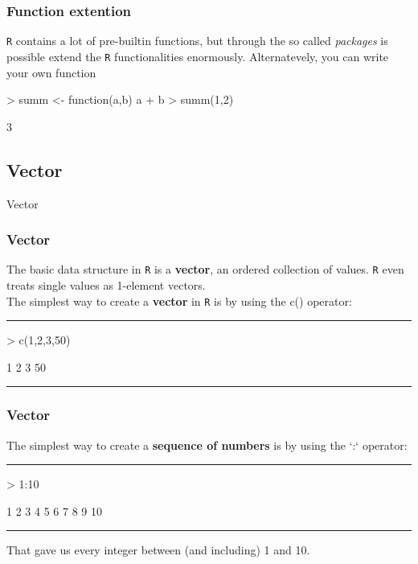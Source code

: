 \documentclass{beamer}
\begin{document}
\begin{frame}[fragile]
	\frametitle{Function extention}
	\texttt{R} contains a lot of pre-builtin functions, but through the so called \textit{packages} is possible extend the \texttt{R} functionalities enormously.
	\vspace{30pt}
	Alternatevely, you can write your own function
\begin{Schunk}
\begin{Sinput}
> summ <- function(a,b){ a + b }
> summ(1,2)
\end{Sinput}
\begin{Soutput}
[1] 3
\end{Soutput}
\end{Schunk}
\end{frame}



\subsection{Vector}
\begin{frame}
	\centering \Huge Vector
\end{frame}

\begin{frame}[fragile]
	\frametitle{Vector}
	The basic data structure in \texttt{R} is a \textbf{vector}, an ordered collection of values. \texttt{R} even treats single values as 1-element vectors.\\
	The simplest way to create a \textbf{vector} in \texttt{R} is by using the c() operator:
	\rule{\textwidth}{0.4pt}
\begin{Schunk}
\begin{Sinput}
> c(1,2,3,50)
\end{Sinput}
\begin{Soutput}
[1]  1  2  3 50
\end{Soutput}
\end{Schunk}
\rule{\textwidth}{0.4pt}
\vspace{20pt}
\end{frame}

\begin{frame}[fragile]
	\frametitle{Vector}
	The simplest way to create a \textbf{sequence of numbers} is by using the `:` operator:
	\rule{\textwidth}{0.4pt}
\begin{Schunk}
\begin{Sinput}
> 1:10
\end{Sinput}
\begin{Soutput}
 [1]  1  2  3  4  5  6  7  8  9 10
\end{Soutput}
\end{Schunk}
\rule{\textwidth}{0.4pt}
\vspace{20pt}
That gave us every integer between (and including) 1 and 10.
\end{frame}
\end{document}
